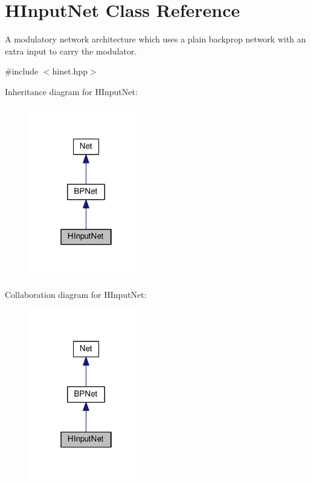 \hypertarget{classHInputNet}{}\section{H\+Input\+Net Class Reference}
\label{classHInputNet}


A modulatory network architecture which uses a plain backprop network with an extra input to carry the modulator.  




{\ttfamily \#include $<$hinet.\+hpp$>$}



Inheritance diagram for H\+Input\+Net\+:
\nopagebreak
\begin{figure}[H]
\begin{center}
\leavevmode
\includegraphics[width=142pt]{classHInputNet__inherit__graph}
\end{center}
\end{figure}


Collaboration diagram for H\+Input\+Net\+:
\nopagebreak
\begin{figure}[H]
\begin{center}
\leavevmode
\includegraphics[width=142pt]{classHInputNet__coll__graph}
\end{center}
\end{figure}
